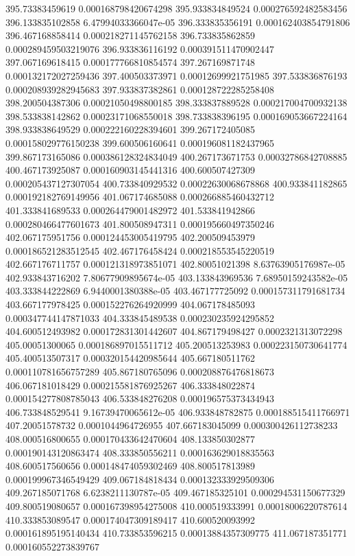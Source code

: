 {395.73383459619 0.000168798420674298
395.933834849524 0.000276592482583456
396.133835102858 6.47994033366047e-05
396.333835356191 0.000162403854791806
396.467168858414 0.000218271145762158
396.733835862859 0.000289459503219076
396.933836116192 0.000391511470902447
397.067169618415 0.000177766810854574
397.267169871748 0.000132172027259436
397.400503373971 0.00012699921751985
397.533836876193 0.000208939282945683
397.933837382861 0.000128722285258408
398.200504387306 0.00021050498800185
398.333837889528 0.000217004700932138
398.533838142862 0.00023171068550018
398.733838396195 0.000169053667224164
398.933838649529 0.000222160228394601
399.267172405085 0.000158029776150238
399.600506160641 0.000196081182437965
399.867173165086 0.000386128324834049
400.267173671753 0.00032786842708885
400.467173925087 0.000160903145441316
400.600507427309 0.000205437127307054
400.733840929532 0.00022630068678868
400.933841182865 0.000192182769149956
401.067174685088 0.000266885460432712
401.333841689533 0.000264479001482972
401.533841942866 0.000280466477601673
401.800508947311 0.000195660497350246
402.067175951756 0.000124453005419795
402.200509453979 0.000186521283512545
402.467176458424 0.000218553545220519
402.667176711757 0.000121318973851071
402.80051021398 8.63763905176987e-05
402.933843716202 7.80677909895674e-05
403.133843969536 7.68950159243582e-05
403.333844222869 6.9440001380388e-05
403.467177725092 0.000157311791681734
403.667177978425 0.000152276264920999
404.067178485093 0.000347744147871033
404.333845489538 0.000230235924295852
404.600512493982 0.000172831301442607
404.867179498427 0.0002321313072298
405.00051300065 0.000186897015511712
405.200513253983 0.000223150730641774
405.400513507317 0.000320154420985644
405.667180511762 0.000110781656757289
405.867180765096 0.000208876476818673
406.067181018429 0.000215581876925267
406.333848022874 0.000154277808785043
406.533848276208 0.000196575373434943
406.733848529541 9.16739470065612e-05
406.933848782875 0.000188515411766971
407.20051578732 0.0001044964726955
407.667183045099 0.000300426112738233
408.000516800655 0.000170433642470604
408.133850302877 0.000190143120863474
408.333850556211 0.000163629018835563
408.600517560656 0.000148474059302469
408.800517813989 0.000199967346549429
409.067184818434 0.000132333929509306
409.267185071768 6.6238211130787e-05
409.467185325101 0.000294531150677329
409.800519080657 0.000167398954275008
410.000519333991 0.00018006220787614
410.333853089547 0.000174047309189417
410.600520093992 0.000161895195140434
410.733853596215 0.00013884357309775
411.067187351771 0.000160552273839767
}
